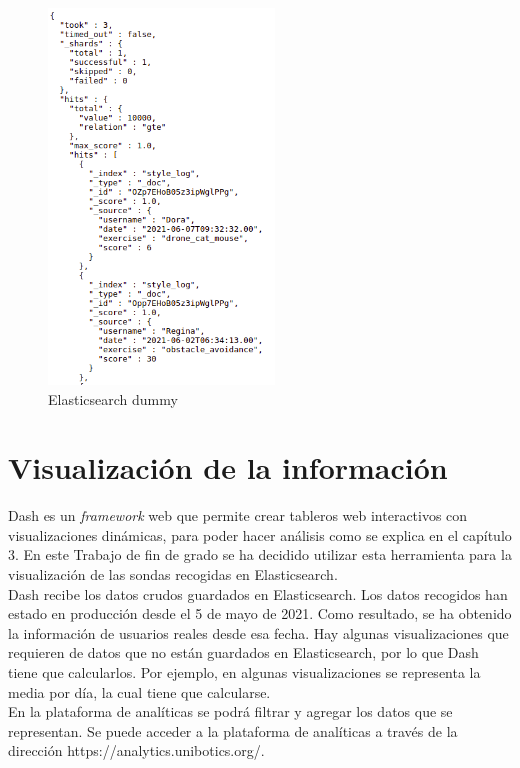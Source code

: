 \begin{figure}[H]
    \centering
    \includegraphics[width=6cm, keepaspectratio]{img/dummy.png}
    \caption{Elasticsearch dummy}
    \label{fig:dummy}
\end{figure}

\section{Visualización de la información}

Dash es un \textit{framework} web que permite crear tableros web interactivos con visualizaciones dinámicas, para poder hacer análisis como se explica en el capítulo 3. En este Trabajo de fin de grado se ha decidido utilizar esta herramienta para la visualización de las sondas recogidas en Elasticsearch.\\

Dash recibe los datos crudos guardados en Elasticsearch. Los datos recogidos han estado en producción desde el 5 de mayo de 2021. Como resultado, se ha obtenido la información de usuarios reales desde esa fecha. Hay algunas visualizaciones que requieren de datos que no están guardados en Elasticsearch, por lo que Dash tiene que calcularlos. Por ejemplo, en algunas visualizaciones se representa la media por día, la cual tiene que calcularse.\\

En la plataforma de analíticas se podrá filtrar y agregar los datos que se representan. Se puede acceder a la plataforma de analíticas a través de la dirección https://analytics.unibotics.org/.\\

